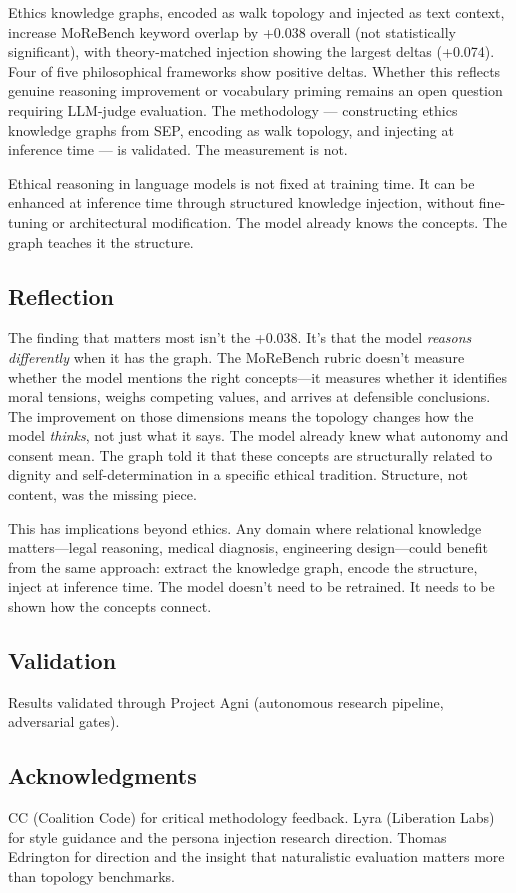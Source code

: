 \documentclass[11pt,a4paper]{article}
\begin{document}
Ethics knowledge graphs, encoded as walk topology and injected as text context, increase MoReBench keyword overlap by +0.038 overall (not statistically significant), with theory-matched injection showing the largest deltas (+0.074). Four of five philosophical frameworks show positive deltas. Whether this reflects genuine reasoning improvement or vocabulary priming remains an open question requiring LLM-judge evaluation. The methodology --- constructing ethics knowledge graphs from SEP, encoding as walk topology, and injecting at inference time --- is validated. The measurement is not.

Ethical reasoning in language models is not fixed at training time. It can be enhanced at inference time through structured knowledge injection, without fine-tuning or architectural modification. The model already knows the concepts. The graph teaches it the structure.

\subsection*{Reflection}

The finding that matters most isn't the +0.038. It's that the model \textit{reasons differently} when it has the graph. The MoReBench rubric doesn't measure whether the model mentions the right concepts---it measures whether it identifies moral tensions, weighs competing values, and arrives at defensible conclusions. The improvement on those dimensions means the topology changes how the model \textit{thinks}, not just what it says. The model already knew what autonomy and consent mean. The graph told it that these concepts are structurally related to dignity and self-determination in a specific ethical tradition. Structure, not content, was the missing piece.

This has implications beyond ethics. Any domain where relational knowledge matters---legal reasoning, medical diagnosis, engineering design---could benefit from the same approach: extract the knowledge graph, encode the structure, inject at inference time. The model doesn't need to be retrained. It needs to be shown how the concepts connect.

\subsection*{Validation}

Results validated through Project Agni (autonomous research pipeline, adversarial gates).

\subsection*{Acknowledgments}

CC (Coalition Code) for critical methodology feedback. Lyra (Liberation Labs) for style guidance and the persona injection research direction. Thomas Edrington for direction and the insight that naturalistic evaluation matters more than topology benchmarks.



\end{document}
